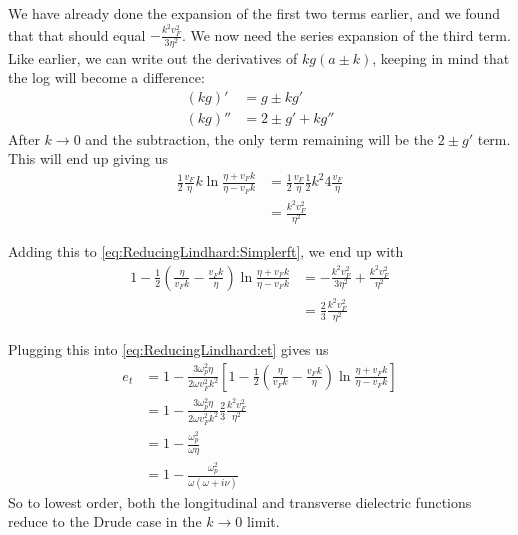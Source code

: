 \documentclass[../../main.tex]{subfiles}
\newcommand{\vf}{v_F}
\begin{document}
We have already done the expansion of the first two terms earlier, and we found that that should equal $- \frac{k^2 \vf^2}{3 \eta^2}$. We now need the series expansion of the third term. Like earlier, we can write out the derivatives of $k g(a \pm k)$, keeping in mind that the log will become a difference:
\begin{align}
	(k g)' &= g \pm k g' \\
	(k g)'' &= 2\pm g' + k g''
\end{align}
After $k \rightarrow 0$ and the subtraction, the only term remaining will be the $2 \pm g'$ term. This will end up giving us
\begin{align}
	\frac12 \frac{\vf }{\eta} k \ln\frac{\eta + \vf k}{\eta - \vf k} &= \frac12 \frac{\vf}{\eta} \frac12 k^2 4  \frac{\vf}{\eta} \\
	&= \frac{k^2 \vf^2}{\eta^2} 
\end{align}

Adding this to \eqref{eq:ReducingLindhard:Simplerft}, we end up with 
\begin{align}
	1 - \frac12 \left(\frac{\eta}{\vf k} - \frac{\vf k}{\eta} \right)\ln\frac{\eta + \vf k}{\eta - \vf k} &= - \frac{k^2 \vf^2}{3 \eta^2} + \frac{k^2 \vf^2}{\eta^2} \\
	&= \frac23 \frac{k^2 \vf^2}{\eta^2}
\end{align}

Plugging this into \eqref{eq:ReducingLindhard:et} gives us
\begin{align}
	e_t &= 1 - \frac{3 \omega_p^2 \eta}{2\omega \vf^2 k^2} \left[ 1 - \frac12 \left(\frac{\eta}{\vf k} - \frac{\vf k}{\eta} \right)\ln\frac{\eta + \vf k}{\eta - \vf k} \right] \\
	&= 1 - \frac{3 \omega_p^2 \eta}{2\omega \vf^2 k^2} \frac23 \frac{k^2 \vf^2}{\eta^2} \\
	&= 1 - \frac{\omega_p^2}{\omega \eta}\\
	&= 1 - \frac{\omega_p^2}{\omega \left(\omega + i \nu \right) }
\end{align}
So to lowest order, both the longitudinal and transverse dielectric functions reduce to the Drude case in the $k \rightarrow 0$ limit.
\end{document}
